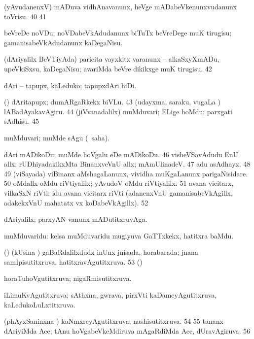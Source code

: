 {  (yAvudanenxV) mADuva vidhAnavanunx, heVge
mADabeVkenunxvudanunx toVrisu. 
\num{40}  
\num{41}  

  beVreDe noVDu; noVDabeVkAdudanunx biTuTx beVreDege muK
tirugisu; gamanisabeVkAdudanunx kaDegaNisu. 

  (dAriyalilx BeVTiyAda) paricita vayxkitx \mo varanunx --
alkaSxyXmADu, upeVkiSxsu, kaDegaNisu; avariMda beVre dikikxge muK
tirugisu.  
\num{42}  

  dAri -- tapupx, kaLeduko; tapupxdAri hiDi. 

  (\rUpa) dAritapupx; dumARgaRkekx biVLu. 
 \num{43}  (udayxma, saraku, \mo vugaLa \vi)
lABadAyakavAgiru. 
\num{44}  (jiVvanadalilx)
muMduvari; ELige hoMdu; parxgati sAdhisu. 
\num{45}  

  muMduvari; muMde sAgu (\rUpa\ saha). 

  dAri mADikoDu; muMde hoVgalu eDe mADikoDu. 
\num{46}  visheVSavAdudu EnU
allx; rUDhiyadakikxMta BinanxveVnU allx; mAmUlinadeV. 
\num{47}  adu asAdhayx. 
\num{48}  
\num{49}  (viSayada) viBinanx aMshagaLanunx,
vividha muKgaLanunx parigaNisidare. 
\num{50}  oMdallx oMdu riVtiyalilx; yAvudoV
oMdu riVtiyalilx. 
\num{51}  avana vicitarx, vilkaSxN riVti:
 idu avana vicitarx riVti (adanenxVnU
gamanisabeVkAgillx, adakekxVnU mahatatx vx
koDabeVkAgillx). 
\num{52} 

  dAriyalilx; parxyAN \mo vanunx mADutitxruvAga. 

  muMduvaridu: kelsa muMduvaridu mugiyuva GaTTxkekx, hatitxra
baMdu. 

  (\AmA) (kUsina \vi) gaBaRdalilxdudx inUnx jnisada,
horabarada; jnana samIpisutitxruva, hatitxravAgutitxruva. 
 \num{53}  (\AmA) 

  horaTuhoVgutitxruva; nigaRmisutitxruva. 

  iLimuKvAgutitxruva; sAthxna, gwrava, pirxVti
kaDameyAgutitxruva, kaLedukoLuLxtitxruva. 

  (phAyxSaninxna
\vi) kaNmxreyAgutitxruva; nashisutitxruva. 
 \num{54}  
\num{55}  tananx dAriyiMda Ace; tAnu
hoVgabeVkeMdiruva mAgaRdiMda Ace, dUravAgiruva. 
\num{56}  

}
